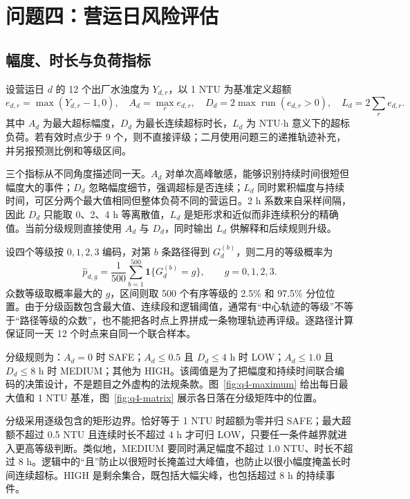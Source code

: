 \documentclass[UTF8,12pt,a4paper]{ctexart}
\begin{document}
\section{问题四：营运日风险评估}

\subsection{幅度、时长与负荷指标}

设营运日 $d$ 的 12 个出厂水浊度为 $Y_{d,r}$，以 1 NTU 为基准定义超额
\begin{equation}
e_{d,r}=\max(Y_{d,r}-1,0),\quad
A_d=\max_re_{d,r},\quad
D_d=2\max\operatorname{run}(e_{d,r}>0),\quad
L_d=2\sum_re_{d,r}.
\label{eq:risk}
\end{equation}
其中 $A_d$ 为最大超标幅度，$D_d$ 为最长连续超标时长，$L_d$ 为 NTU$\cdot$h 意义下的超标负荷。若有效时点少于 9 个，则不直接评级；二月使用问题三的递推轨迹补充，并另报预测比例和等级区间。

三个指标从不同角度描述同一天。$A_d$ 对单次高峰敏感，能够识别持续时间很短但幅度大的事件；$D_d$ 忽略幅度细节，强调超标是否连续；$L_d$ 同时累积幅度与持续时间，可区分两个最大值相同但整体负荷不同的营运日。2 h 系数来自采样间隔，因此 $D_d$ 只能取 0、2、4 h 等离散值，$L_d$ 是矩形求和近似而非连续积分的精确值。当前分级规则直接使用 $A_d$ 与 $D_d$，同时输出 $L_d$ 供解释和后续规则升级。

设四个等级按 $0,1,2,3$ 编码，对第 $b$ 条路径得到 $G_d^{(b)}$，则二月的等级概率为
\begin{equation}
\widehat p_{d,g}=\frac{1}{500}\sum_{b=1}^{500}
\mathbf 1\{G_d^{(b)}=g\},\qquad g=0,1,2,3.
\label{eq:grade-probability}
\end{equation}
众数等级取概率最大的 $g$，区间则取 500 个有序等级的 2.5\% 和 97.5\% 分位位置。由于分级函数包含最大值、连续段和逻辑阈值，通常有“中心轨迹的等级”不等于“路径等级的众数”，也不能把各时点上界拼成一条物理轨迹再评级。逐路径计算保证同一天 12 个时点来自同一个联合样本。

分级规则为：$A_d=0$ 时 SAFE；$A_d\le0.5$ 且 $D_d\le4$ h 时 LOW；$A_d\le1.0$ 且 $D_d\le8$ h 时 MEDIUM；其他为 HIGH。该阈值是为了把幅度和持续时间联合编码的决策设计，不是题目之外虚构的法规条款。图~\ref{fig:q4-maximum} 给出每日最大值和 1 NTU 基准，图~\ref{fig:q4-matrix} 展示各日落在分级矩阵中的位置。

分级采用逐级包含的矩形边界。恰好等于 1 NTU 时超额为零并归 SAFE；最大超额不超过 0.5 NTU 且连续时长不超过 4 h 才可归 LOW，只要任一条件越界就进入更高等级判断。类似地，MEDIUM 要同时满足幅度不超过 1.0 NTU、时长不超过 8 h。逻辑中的“且”防止以很短时长掩盖过大峰值，也防止以很小幅度掩盖长时间连续超标。HIGH 是剩余集合，既包括大幅尖峰，也包括超过 8 h 的持续事件。
\end{document}
